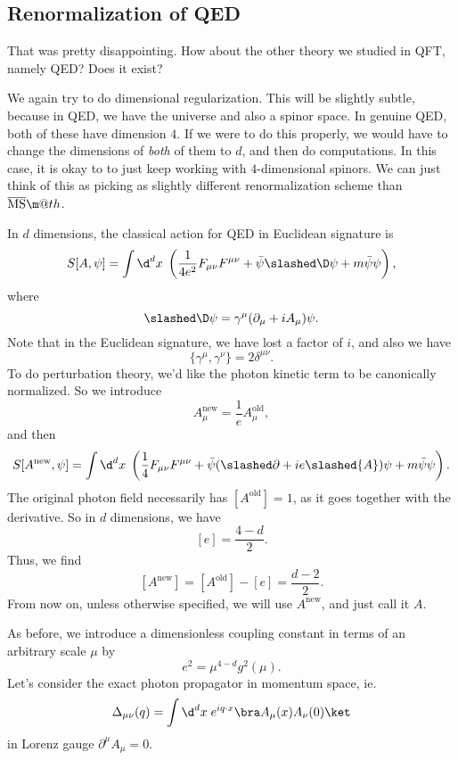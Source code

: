 \documentclass[a4paper]{article}
\makeatletter
\newcommand*{\textoverline}[1]{$\overline{\hbox{#1}}\m@th$}
\makeatother
\begin{document}
\subsection{Renormalization of QED}
That was pretty disappointing. How about the other theory we studied in QFT, namely QED? Does it exist?

We again try to do dimensional regularization. This will be slightly subtle, because in QED, we have the universe and also a spinor space. In genuine QED, both of these have dimension $4$. If we were to do this properly, we would have to change the dimensions of \emph{both} of them to $d$, and then do computations. In this case, it is okay to to just keep working with $4$-dimensional spinors. We can just think of this as picking as slightly different renormalization scheme than \textoverline{MS}.

In $d$ dimensions, the classical action for QED in Euclidean signature is
\[
  S[A, \psi] = \int \d^d x\; \left(\frac{1}{4 e^2} F_{\mu\nu}F^{\mu\nu} + \bar\psi \slashed \D \psi + m \bar\psi\psi\right),
\]
where
\[
  \slashed \D\psi = \gamma^\mu (\partial_\mu + i A_\mu) \psi.
\]
Note that in the Euclidean signature, we have lost a factor of $i$, and also we have
\[
  \{\gamma^\mu, \gamma^\nu\} = 2 \delta^{\mu\nu}.
\]
To do perturbation theory, we'd like the photon kinetic term to be canonically normalized. So we introduce
\[
  A_\mu^{\mathrm{new}} = \frac{1}{e} A_\mu^{\mathrm{old}},
\]
and then
\[
  S[A^\mathrm{new}, \psi] = \int \d^d x\; \left(\frac{1}{4} F_{\mu\nu}F^{\mu\nu} + \bar\psi (\slashed\partial + i e \slashed{A}) \psi + m \bar\psi \psi\right).
\]
The original photon field necessarily has $[A^{\mathrm{old}}] = 1$, as it goes together with the derivative. So in $d$ dimensions, we have
\[
  [e] = \frac{4 - d}{2}.
\]
Thus, we find
\[
  [A^{\mathrm{new}}] = [A^{\mathrm{old}}] - [e] = \frac{d - 2}{2}.
\]
From now on, unless otherwise specified, we will use $A^{\mathrm{new}}$, and just call it $A$.

As before, we introduce a dimensionless coupling constant in terms of an arbitrary scale $\mu$ by
\[
  e^2 = \mu^{4 - d} g^2(\mu).
\]
Let's consider the exact photon propagator in momentum space, ie.
\[
  \Delta_{\mu\nu}(q) = \int \d^d x\; e^{iq \cdot x} \bra A_\mu (x) A_\nu(0)\ket
\]
in Lorenz gauge $\partial^\mu A_\mu = 0$.
\end{document}
